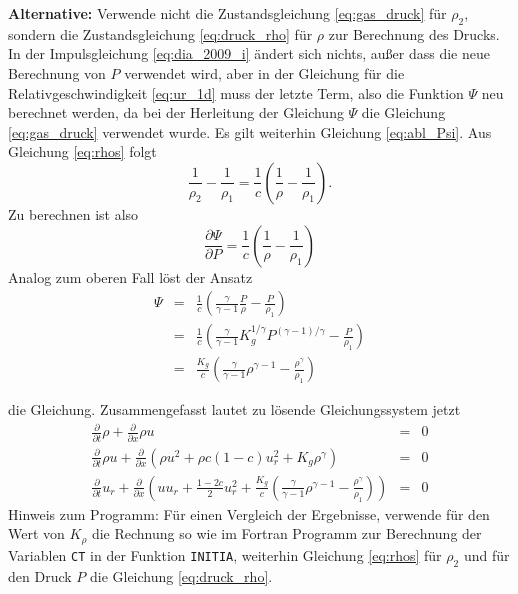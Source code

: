 {\bf Alternative:} Verwende nicht die Zustandsgleichung
\ref{eq:gas_druck} für $\rho_2$, sondern die Zustandsgleichung
\ref{eq:druck_rho} für $\rho$ zur Berechnung des Drucks. In der
Impulsgleichung \ref{eq:dia_2009_i} ändert sich nichts, außer dass die
neue Berechnung von $P$ verwendet wird, aber in der Gleichung für die
Relativgeschwindigkeit \ref{eq:ur_1d} muss der letzte Term, also die
Funktion $\Psi$ neu berechnet werden, da bei der Herleitung der
Gleichung $\Psi$ die Gleichung \ref{eq:gas_druck} verwendet wurde.  Es
gilt weiterhin Gleichung \ref{eq:abl_Psi}. Aus Gleichung \ref{eq:rhos}
folgt
\[
\frac{1}{\rho_2}-\frac{1}{\rho_1} =
\frac{1}{c}\left(\frac{1}{\rho}-\frac{1}{\rho_1} \right).
\]
Zu berechnen ist also
\begin{equation}
\frac{\partial \Psi}{\partial P} =
\frac{1}{c}\left(\frac{1}{\rho}-\frac{1}{\rho_1} \right)\label{eq:alter_abl_psi}
\end{equation}
Analog zum oberen Fall löst der Ansatz
\begin{eqnarray}
\Psi &=& \frac{1}{c}\left(\frac{\gamma}{\gamma-1} \frac{P}{\rho} -
\frac{P}{\rho_1}\right)\\
&=& \frac{1}{c} \left(\frac{\gamma}{\gamma-1} K_g^{1/\gamma}
P^{(\gamma-1)/\gamma} - \frac{P}{\rho_1} \right)\label{eq:ur_Psi_2_p} \\
&=& \frac{K_g}{c}\left(\frac{\gamma}{\gamma-1} \rho^{\gamma-1} -
\frac{ \rho^{\gamma}}{\rho_1}\right)\label{eq:ur_Psi_2_rho}
\end{eqnarray}

die Gleichung. Zusammengefasst lautet zu lösende Gleichungssystem jetzt
\begin{eqnarray}
\frac{\partial}{\partial t}\rho + \frac{\partial}{\partial x} \rho u
&=&  0\label{eq:dia_2009_k_variante}\\
%
\frac{\partial}{\partial t} \rho u + \frac{\partial}{\partial x} (
\rho u^2 + \rho c (1-c) u_r^2 + K_g\rho^{\gamma})&=&
0 \label{eq:dia_2009_i_variante}\\
%
  \frac{\partial}{\partial t} u_r + \frac{\partial}{\partial x} \left(
  uu_r + \frac{1-2c}{2} u_r^2 +
\frac{K_g}{c}\left(\frac{\gamma}{\gamma-1} \rho^{\gamma-1} -
\frac{ \rho^{\gamma}}{\rho_1}\right)\right) &=& 0
\label{eq:dia_2009_ur_variante}
\end{eqnarray}
Hinweis zum Programm: Für einen Vergleich der Ergebnisse, verwende für
den Wert von $K_\rho$ die Rechnung so wie im Fortran Programm zur
Berechnung der Variablen {\tt CT} in der Funktion {\tt INITIA},
weiterhin Gleichung \ref{eq:rhos} für $\rho_2$ und für den Druck $P$ die
Gleichung \ref{eq:druck_rho}.

